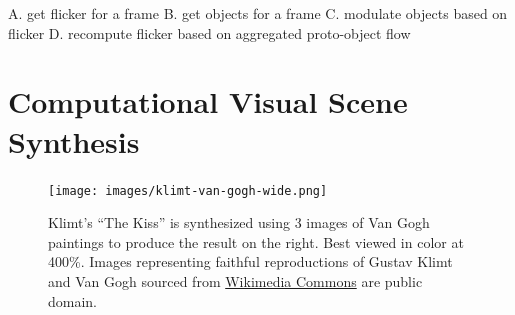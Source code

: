 \documentclass[a4paper,10pt,final]{ThesisStyle}
\begin{document}
A. get flicker for a frame
B. get objects for a frame
C. modulate objects based on flicker
D. recompute flicker based on aggregated proto-object flow






\chapter{Computational Visual Scene Synthesis}
\label{ch:synthesis-visual}

\minitoc




\begin{figure}[ht]
 \texttt{[image: images/klimt-van-gogh-wide.png]}
 \caption{Klimt's ``The Kiss'' is synthesized using 3 images of Van Gogh paintings to produce the result on the right.  Best viewed in color at 400\%.  Images representing faithful reproductions of Gustav Klimt and Van Gogh sourced from \href{http://commons.wikimedia.org}{Wikimedia Commons} are public domain.}
 \label{fig:teaser}
\end{figure}
\end{document}
